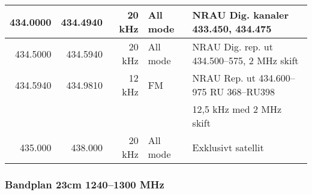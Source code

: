 \begin{tabular}{rrrll}
	434.0000 & 434.4940 & 20 kHz  & All mode     & NRAU Dig. kanaler 433.450, 434.475                \\ \hline
	434.5000 & 434.5940 & 20 kHz  & All mode     & NRAU Dig. rep. ut 434.500--575, 2 MHz skift       \\ \hline
	434.5940 & 434.9810 & 12 kHz  & FM           & NRAU Rep. ut 434.600--975 RU 368--RU398           \\
	&          &         &              & 12,5 kHz med 2 MHz skift                          \\ \hline
	435.000  & 438.000  & 20 kHz  & All mode     & Exklusivt satellit\\
\end{tabular}

\subsubsection{Bandplan 23cm 1240--1300 MHz}

